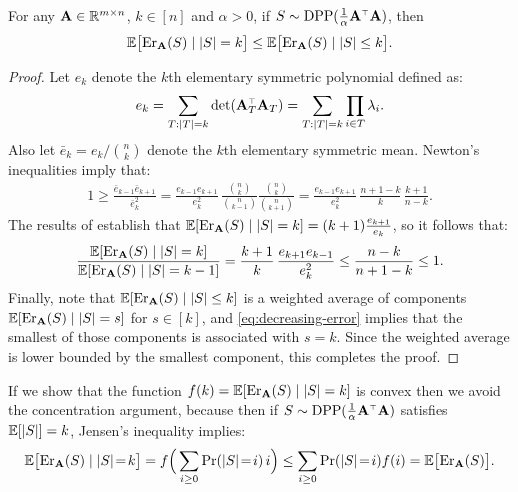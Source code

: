 \documentclass{article}
\begin{document}
\begin{theorem}
  For any $\mathbf A\in\mathbb R^{m\times n}$, $k\in[n]$ and $\alpha>0$, if
  $S\sim\DPP(\frac1\alpha\A^\top\A)$, then
  \begin{align*}
    \mathbb E\big[\mathrm{Er}_\mathbf A(S)\mid |S|=k\big] \leq \mathbb E\big[\mathrm{Er}_\mathbf A(S)\mid |S|\leq k\big].
  \end{align*}
\end{theorem}
\begin{proof}
Let $e_k$ denote the $k$th elementary symmetric polynomial defined
as:
\begin{align*}
e_k = \sum_{T:|T|=k}\det(\A_T^\top\A_T) = \sum_{T:|T|=k}\prod_{i\in T}\lambda_i.
\end{align*}
Also let $\bar{e}_k=e_k/{n\choose k}$ denote the $k$th
elementary symmetric mean. Newton's inequalities imply that:
\begin{align*}
1\geq \frac{\bar e_{k-1}\bar e_{k+1}}{\bar e_k^2} =
  \frac{e_{k-1}e_{k+1}}{e_k^2}\,\frac{{n\choose k}}{{n\choose
  k-1}}\frac{{n\choose k}} {{n\choose k+1}} =
  \frac{e_{k-1}e_{k+1}}{e_k^2}\,\frac{n+1-k}{k}\,\frac{k+1}{n-k}. 
\end{align*}
The results of
\cite{pca-volume-sampling,more-efficient-volume-sampling} establish
that $\mathbb E[\mathrm{Er}_\mathbf A(S)\mid |S|=k] = (k+1)\frac{e_{k+1}}{e_k}$, so it
follows that:
\begin{align}
  \frac{\mathbb E[\mathrm{Er}_\mathbf A(S)\mid |S|=k]}{\mathbb E[\mathrm{Er}_\mathbf A(S)\mid|S|=k-1]}
  = \frac{k+1}{k}\,\frac{e_{k+1}e_{k-1}}{e_k^2}\leq
  \frac{n-k}{n+1-k}\leq 1.\label{eq:decreasing-error}
\end{align}
Finally, note that $\mathbb E[\mathrm{Er}_\mathbf A(S)\mid|S|\leq k]$ is a weighted average
of components $\mathbb E[\mathrm{Er}_\mathbf A(S)\mid|S|= s]$ for $s\in[k]$, and
\eqref{eq:decreasing-error} implies that the smallest of those components
is associated with $s=k$. Since the weighted average is lower bounded by the
smallest component, this completes the proof.
\end{proof}
\begin{remark}
If we show that the function $f(k)=\mathbb E[\mathrm{Er}_\mathbf A(S)\mid |S|=k]$ is
convex then we avoid the concentration argument, because then if
$S\sim\DPP(\frac1{\alpha}\A^\top\A)$ satisfies
$\mathbb E[|S|]=k$, Jensen's inequality implies:
\begin{align*}
  \mathbb E\big[\mathrm{Er}_\mathbf A(S)\mid |S|\!=\!k\big]=f\Big(\sum_{i\geq 0}\mathrm{Pr}(|S|\!=\!i)\,i\Big) \leq
  \sum_{i\geq 0}\mathrm{Pr}(|S|\!=\!i)f(i)=\mathbb E\big[\mathrm{Er}_\mathbf A(S)\big].
\end{align*}
\end{remark}
\end{document}

